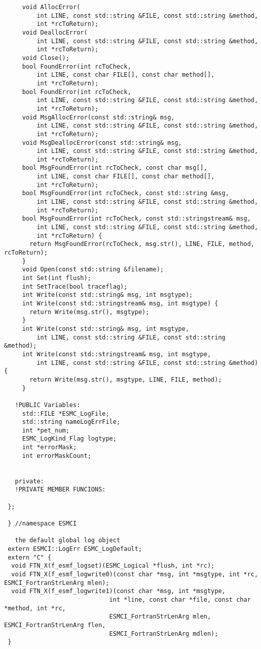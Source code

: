 \begin{verbatim}     void AllocError(
         int LINE, const std::string &FILE, const std::string &method,
         int *rcToReturn);
     void DeallocError(
         int LINE, const std::string &FILE, const std::string &method,
         int *rcToReturn);
     void Close();
     bool FoundError(int rcToCheck,
         int LINE, const char FILE[], const char method[],
         int *rcToReturn);
     bool FoundError(int rcToCheck,
         int LINE, const std::string &FILE, const std::string &method,
         int *rcToReturn);
     void MsgAllocError(const std::string& msg,
         int LINE, const std::string &FILE, const std::string &method,
         int *rcToReturn);
     void MsgDeallocError(const std::string& msg,
         int LINE, const std::string &FILE, const std::string &method,
         int *rcToReturn);
     bool MsgFoundError(int rcToCheck, const char msg[],
         int LINE, const char FILE[], const char method[],
         int *rcToReturn);
     bool MsgFoundError(int rcToCheck, const std::string &msg,
         int LINE, const std::string &FILE, const std::string &method,
         int *rcToReturn);
     bool MsgFoundError(int rcToCheck, const std::stringstream& msg,
         int LINE, const std::string &FILE, const std::string &method,
         int *rcToReturn) {
       return MsgFoundError(rcToCheck, msg.str(), LINE, FILE, method, rcToReturn);
     }
     void Open(const std::string &filename);
     int Set(int flush);
     int SetTrace(bool traceflag);
     int Write(const std::string& msg, int msgtype);
     int Write(const std::stringstream& msg, int msgtype) {
       return Write(msg.str(), msgtype);
     }
     int Write(const std::string& msg, int msgtype,
         int LINE, const std::string &FILE, const std::string &method);
     int Write(const std::stringstream& msg, int msgtype,
         int LINE, const std::string &FILE, const std::string &method) {
       return Write(msg.str(), msgtype, LINE, FILE, method);
     }
 
   !PUBLIC Variables:
     std::FILE *ESMC_LogFile;
     std::string nameLogErrFile;
     int *pet_num;
     ESMC_LogKind_Flag logtype;
     int *errorMask;
     int errorMaskCount;
 
 
   private:
   !PRIVATE MEMBER FUNCIONS:
 
 };
 
 } //namespace ESMCI
 
   the default global log object
 extern ESMCI::LogErr ESMC_LogDefault;
 extern "C" {
  void FTN_X(f_esmf_logset)(ESMC_Logical *flush, int *rc);
  void FTN_X(f_esmf_logwrite0)(const char *msg, int *msgtype, int *rc, ESMCI_FortranStrLenArg mlen);
  void FTN_X(f_esmf_logwrite1)(const char *msg, int *msgtype,
                             int *line, const char *file, const char *method, int *rc,
                             ESMCI_FortranStrLenArg mlen, ESMCI_FortranStrLenArg flen,
                             ESMCI_FortranStrLenArg mdlen);
 }
 \end{verbatim}

\setlength{\parskip}{\oldparskip}
\setlength{\parindent}{\oldparindent}
\setlength{\baselineskip}{\oldbaselineskip}
